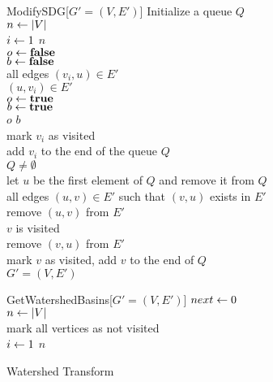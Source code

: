 \documentclass{llncs}
\begin{document}
\begin{algorithm}{ModifySDG}[$G'=(V,E')$]{
    \label{algo:modifysdg}
  }
  Initialize a queue $Q$ \\
  $n \mathrel{\leftarrow} |V|$ \\
  \qfor $i \mathrel{\leftarrow} 1$ \qto $n$ \\
  \qdo $o \mathrel{\leftarrow} \textbf{false}$ \\
  $b \mathrel{\leftarrow} \textbf{false}$ \\
  \qfor all edges $(v_i,u) \in E'$ \\
  \qdo \qif $(u,v_i) \in E'$ \\
  \qthen $o \mathrel{\leftarrow} \textbf{true}$ \\
  \qelse $b \mathrel{\leftarrow} \textbf{true}$ \qfi \qrof \\
  \qif $o$ \qand $b$ \\
  \qthen mark $v_i$ as visited \\
  add $v_i$ to the end of the queue $Q$ \qfi \qrof \\
  \qwhile $Q \neq \emptyset$ \\
  \qdo let $u$ be the first element of $Q$ and remove it from $Q$\\
  \qfor all edges $(u,v) \in E'$ such that $(v,u)$ exists in $E'$\\
  \qdo remove $(u,v)$ from $E'$ \\
  \qif $v$ is visited \\
  \qthen remove $(v,u)$ from $E'$ \\
  \qelse mark $v$ as visited, add $v$ to the end of $Q$ \qfi \qend \qrof \\
  \qreturn $G'=(V,E')$
\end{algorithm}


\begin{algorithm}{GetWatershedBasins}[$G'=(V,E')$]{
    \label{algo:modifysdg}
  }
  $next \mathrel{\leftarrow} 0$ \\
  $n \mathrel{\leftarrow} |V|$ \\
  mark all vertices as not visited \\
  \qfor $i \mathrel{\leftarrow} 1$ \qto $n$ \\
  \qdo
\end{algorithm}



Watershed Transform
\end{document}
